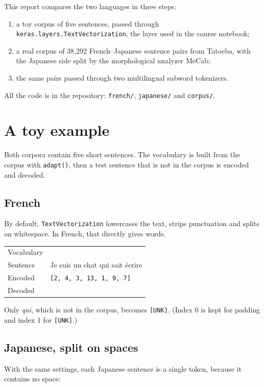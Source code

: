 \documentclass[11pt,a4paper]{article}
\makeatletter
\newcommand\code[1]{\texttt{#1}}
\newenvironment{result}
  {\par\smallskip\noindent\begin{tabular}{@{}l p{0.78\textwidth}@{}}}
  {\end{tabular}\par\smallskip}
\newcommand\row[2]{\textsf{\small\color{muted}#1} & #2 \\[3pt]}
\makeatother
\begin{document}
This report compares the two languages in three steps:
\begin{enumerate}
  \item a toy corpus of five sentences, passed through
        \code{keras.layers.TextVectorization}, the layer used in the course
        notebook;
  \item a real corpus of 38{,}292 French--Japanese sentence pairs from
        Tatoeba, with the Japanese side split by the morphological analyzer
        MeCab;
  \item the same pairs passed through two multilingual subword tokenizers.
\end{enumerate}
All the code is in the repository: \code{french/}, \code{japanese/} and
\code{corpus/}.

\section{A toy example}

Both corpora contain five short sentences. The vocabulary is built from the
corpus with \code{adapt()}, then a test sentence that is not in the corpus is
encoded and decoded.

\subsection{French}

By default, \code{TextVectorization} lowercases the text, strips punctuation
and splits on whitespace. In French, that directly gives words.

\begin{result}
  \row{Vocabulary}{\tokens[fr]{UNK|je|un|suis|texte|écrivain|écrire|si|sait|pense|pas|ne|chat|autre}}
  \row{Sentence}{Je suis un chat qui sait écrire}
  \row{Encoded}{\code{[2, 4, 3, 13, 1, 9, 7]}}
  \row{Decoded}{\tokens[fr]{je|suis|un|chat|UNK|sait|écrire}}
\end{result}

Only \emph{qui}, which is not in the corpus, becomes \code{[UNK]}. (Index 0 is
kept for padding and index 1 for \code{[UNK]}.)

\subsection{Japanese, split on spaces}

With the same settings, each Japanese sentence is a single token, because it
contains no space:
\end{document}
